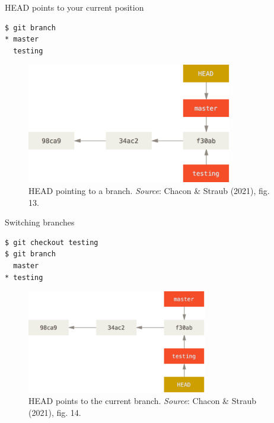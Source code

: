 \documentclass[handout]{beamer}
\begin{document}
\begin{frame}[fragile]{HEAD points to your current position}
\begin{lstlisting}
$ git branch
* master
  testing
\end{lstlisting}
\begin{figure}
	\includegraphics[width=0.8\textwidth]{figures/fig13_head.png}
	\caption{HEAD pointing to a branch. \textit{Source}: Chacon \& Straub (2021), fig. 13.}
\end{figure}
\end{frame}

\begin{frame}[fragile]{Switching branches}
\begin{lstlisting}
$ git checkout testing
$ git branch
  master
* testing
\end{lstlisting}
\begin{figure}
	\includegraphics[width=0.7\textwidth]{figures/fig14_head_switch.png}
	\caption{HEAD points to the current branch. \textit{Source}: Chacon \& Straub (2021), fig. 14.}
\end{figure}
\end{frame}
\end{document}
